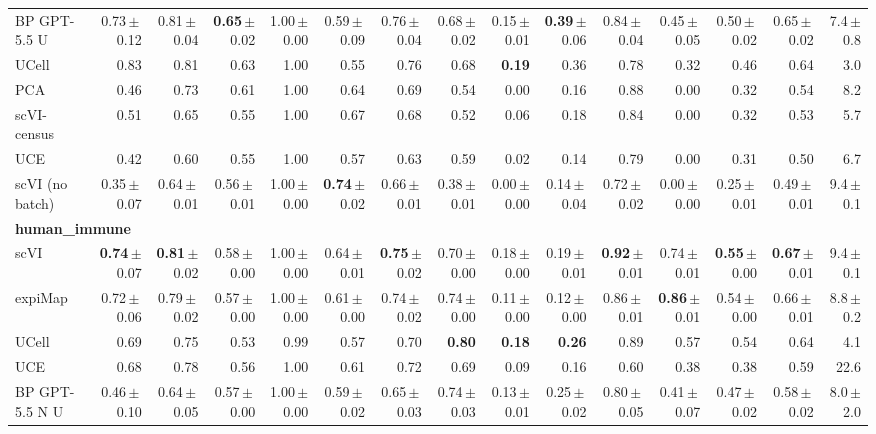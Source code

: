 \begin{table}
\begin{tabular}{lrrrrrrrrrrrrrr}
BP GPT-5.5 U & 0.73\,$\pm$\,0.12 & 0.81\,$\pm$\,0.04 & \textbf{0.65}\,$\pm$\,0.02 & 1.00\,$\pm$\,0.00 & 0.59\,$\pm$\,0.09 & 0.76\,$\pm$\,0.04 & 0.68\,$\pm$\,0.02 & 0.15\,$\pm$\,0.01 & \textbf{0.39}\,$\pm$\,0.06 & 0.84\,$\pm$\,0.04 & 0.45\,$\pm$\,0.05 & 0.50\,$\pm$\,0.02 & 0.65\,$\pm$\,0.02 & 7.4\,$\pm$\,0.8 \\
UCell & 0.83 & 0.81 & 0.63 & 1.00 & 0.55 & 0.76 & 0.68 & \textbf{0.19} & 0.36 & 0.78 & 0.32 & 0.46 & 0.64 & 3.0 \\
PCA & 0.46 & 0.73 & 0.61 & 1.00 & 0.64 & 0.69 & 0.54 & 0.00 & 0.16 & 0.88 & 0.00 & 0.32 & 0.54 & 8.2 \\
scVI-census & 0.51 & 0.65 & 0.55 & 1.00 & 0.67 & 0.68 & 0.52 & 0.06 & 0.18 & 0.84 & 0.00 & 0.32 & 0.53 & 5.7 \\
UCE & 0.42 & 0.60 & 0.55 & 1.00 & 0.57 & 0.63 & 0.59 & 0.02 & 0.14 & 0.79 & 0.00 & 0.31 & 0.50 & 6.7 \\
scVI (no batch) & 0.35\,$\pm$\,0.07 & 0.64\,$\pm$\,0.01 & 0.56\,$\pm$\,0.01 & 1.00\,$\pm$\,0.00 & \textbf{0.74}\,$\pm$\,0.02 & 0.66\,$\pm$\,0.01 & 0.38\,$\pm$\,0.01 & 0.00\,$\pm$\,0.00 & 0.14\,$\pm$\,0.04 & 0.72\,$\pm$\,0.02 & 0.00\,$\pm$\,0.00 & 0.25\,$\pm$\,0.01 & 0.49\,$\pm$\,0.01 & 9.4\,$\pm$\,0.1 \\
\midrule
\multicolumn{15}{l}{\textbf{human\_immune}}\\[1pt]
scVI & \textbf{0.74}\,$\pm$\,0.07 & \textbf{0.81}\,$\pm$\,0.02 & 0.58\,$\pm$\,0.00 & 1.00\,$\pm$\,0.00 & 0.64\,$\pm$\,0.01 & \textbf{0.75}\,$\pm$\,0.02 & 0.70\,$\pm$\,0.00 & 0.18\,$\pm$\,0.00 & 0.19\,$\pm$\,0.01 & \textbf{0.92}\,$\pm$\,0.01 & 0.74\,$\pm$\,0.01 & \textbf{0.55}\,$\pm$\,0.00 & \textbf{0.67}\,$\pm$\,0.01 & 9.4\,$\pm$\,0.1 \\
expiMap & 0.72\,$\pm$\,0.06 & 0.79\,$\pm$\,0.02 & 0.57\,$\pm$\,0.00 & 1.00\,$\pm$\,0.00 & 0.61\,$\pm$\,0.00 & 0.74\,$\pm$\,0.02 & 0.74\,$\pm$\,0.00 & 0.11\,$\pm$\,0.00 & 0.12\,$\pm$\,0.00 & 0.86\,$\pm$\,0.01 & \textbf{0.86}\,$\pm$\,0.01 & 0.54\,$\pm$\,0.00 & 0.66\,$\pm$\,0.01 & 8.8\,$\pm$\,0.2 \\
UCell & 0.69 & 0.75 & 0.53 & 0.99 & 0.57 & 0.70 & \textbf{0.80} & \textbf{0.18} & \textbf{0.26} & 0.89 & 0.57 & 0.54 & 0.64 & 4.1 \\
UCE & 0.68 & 0.78 & 0.56 & 1.00 & 0.61 & 0.72 & 0.69 & 0.09 & 0.16 & 0.60 & 0.38 & 0.38 & 0.59 & 22.6 \\
BP GPT-5.5 N U & 0.46\,$\pm$\,0.10 & 0.64\,$\pm$\,0.05 & 0.57\,$\pm$\,0.00 & 1.00\,$\pm$\,0.00 & 0.59\,$\pm$\,0.02 & 0.65\,$\pm$\,0.03 & 0.74\,$\pm$\,0.03 & 0.13\,$\pm$\,0.01 & 0.25\,$\pm$\,0.02 & 0.80\,$\pm$\,0.05 & 0.41\,$\pm$\,0.07 & 0.47\,$\pm$\,0.02 & 0.58\,$\pm$\,0.02 & 8.0\,$\pm$\,2.0 \\

\end{tabular}
\end{table}
